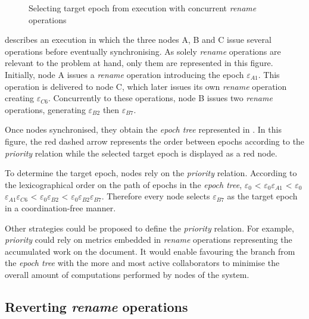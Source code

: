 \documentclass[10pt,journal,compsoc]{IEEEtran}
\let\MYoriglatexcaption\caption
\renewcommand{\caption}[2][\relax]{\MYoriglatexcaption[#2]{#2}}
\newcommand{\epoch}[1]{$\varepsilon_{#1}$}
\begin{document}
\begin{figure}[!ht]
{\begin{minipage}{\linewidth}
            \label{fig:priority-epoch-tree}
        \end{minipage}}
    \caption{Selecting target epoch from execution with concurrent \emph{rename} operations}
    \label{fig:priority-example}
\end{figure}

 describes an execution in which the three nodes A, B and C issue several operations before eventually synchronising.
As solely \emph{rename} operations are relevant to the problem at hand, only them are represented in this figure.
Initially, node A issues a \emph{rename} operation introducing the epoch \epoch{A1}.
This operation is delivered to node C, which later issues its own \emph{rename} operation creating \epoch{C6}.
Concurrently to these operations, node B issues two \emph{rename} operations, generating \epoch{B2} then \epoch{B7}.

Once nodes synchronised, they obtain the \emph{epoch tree} represented in .
In this figure, the red dashed arrow represents the order between epochs according to the \emph{priority} relation while the selected target epoch is displayed as a red node.

To determine the target epoch, nodes rely on the \emph{priority} relation.
According to the lexicographical order on the path of epochs in the \emph{epoch tree}, \epoch{0} < \epoch{0}\epoch{A1} < \epoch{0}\epoch{A1}\epoch{C6} < \epoch{0}\epoch{B2} < \epoch{0}\epoch{B2}\epoch{B7}.
Therefore every node selects \epoch{B7} as the target epoch in a coordination-free manner.

Other strategies could be proposed to define the \emph{priority} relation.
For example, \emph{priority} could rely on metrics embedded in \emph{rename} operations representing the accumulated work on the document.
It would enable favouring the branch from the \emph{epoch tree} with the more and most active collaborators to minimise the overall amount of computations performed by nodes of the system.

\subsection{Reverting \emph{rename} operations}
\end{document}

